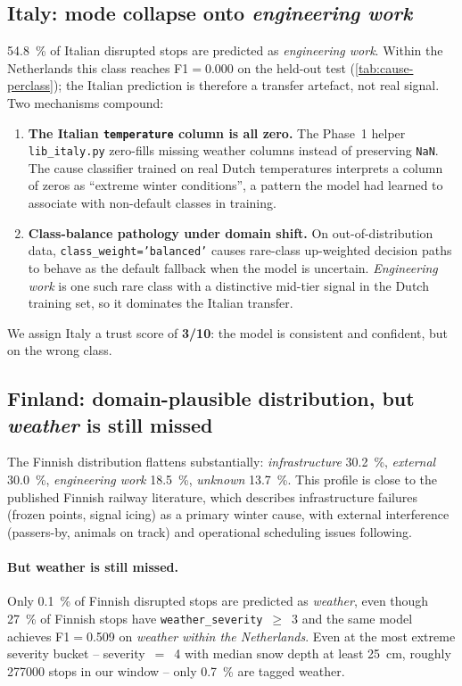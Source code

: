 \subsection{Italy: mode collapse onto \emph{engineering work}}

\SI{54.8}{\percent} of Italian disrupted stops are predicted as \emph{engineering work}. Within the Netherlands this class reaches F1$=$\num{0.000} on the held-out test (\cref{tab:cause-perclass}); the Italian prediction is therefore a transfer artefact, not real signal. Two mechanisms compound:

\begin{enumerate}
    \item \textbf{The Italian \texttt{temperature} column is all zero.} The Phase~1 helper \texttt{lib\_italy.py} zero-fills missing weather columns instead of preserving \texttt{NaN}. The cause classifier trained on real Dutch temperatures interprets a column of zeros as ``extreme winter conditions'', a pattern the model had learned to associate with non-default classes in training.
    \item \textbf{Class-balance pathology under domain shift.} On out-of-distribution data, \texttt{class\_weight='balanced'} causes rare-class up-weighted decision paths to behave as the default fallback when the model is uncertain. \emph{Engineering work} is one such rare class with a distinctive mid-tier signal in the Dutch training set, so it dominates the Italian transfer.
\end{enumerate}

We assign Italy a trust score of \textbf{3/10}: the model is consistent and confident, but on the wrong class.

\subsection{Finland: domain-plausible distribution, but \emph{weather} is still missed}

The Finnish distribution flattens substantially: \emph{infrastructure} \SI{30.2}{\percent}, \emph{external} \SI{30.0}{\percent}, \emph{engineering work} \SI{18.5}{\percent}, \emph{unknown} \SI{13.7}{\percent}. This profile is close to the published Finnish railway literature, which describes infrastructure failures (frozen points, signal icing) as a primary winter cause, with external interference (passers-by, animals on track) and operational scheduling issues following.

\paragraph{But weather is still missed.} Only \SI{0.1}{\percent} of Finnish disrupted stops are predicted as \emph{weather}, even though \SI{27}{\percent} of Finnish stops have \texttt{weather\_severity}~$\geq$~3 and the same model achieves F1$=$\num{0.509} on \emph{weather} \emph{within the Netherlands}. Even at the most extreme severity bucket -- severity~$=$~4 with median snow depth at least \SI{25}{cm}, roughly \num{277000} stops in our window -- only \SI{0.7}{\percent} are tagged weather.

